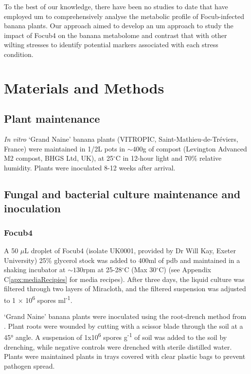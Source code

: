 To the best of our knowledge, there have been no studies to date that have employed \ac{um} to comprehensively analyse the metabolic profile of \ac{Focub}-infected banana plants. Our approach aimed to develop an \ac{um} approach to study the impact of \ac{Focub4} on the banana metabolome and contrast that with other wilting stresses to identify potential markers associated with each stress condition. 

\newpage
\section{Materials and Methods}
\label{sec:Chapter4_MM}

\subsection{Plant maintenance}
\textit{In vitro} ‘Grand Naine’ banana plants (VITROPIC, Saint-Mathieu-de-Tréviers, France) were maintained in 1/2L pots in $\sim400$g of compost (Levington Advanced M2 compost, BHGS Ltd, UK), at 25$^{\circ}$C in 12-hour light and 70\% relative humidity. Plants were inoculated 8-12 weeks after arrival. 

\subsection{Fungal and bacterial culture maintenance and inoculation}

\subsubsection{\acl{Focub4}}
A 50 \(\mu\)L droplet of \acl{Focub4} (isolate UK0001, provided by Dr Will Kay, Exeter University) 25\% glycerol stock was added to 400ml of \acf{pdb} and maintained in a shaking incubator at $\sim130$rpm at 25-28$^{\circ}$C (Max 30$^{\circ}$C) (see Appendix C\ref{apx:mediaRecipies} for media recipes). After three days, the liquid culture was filtered through two layers of Miracloth, and the filtered suspension was adjusted to 1 × 10\textsuperscript{6} spores ml\textsuperscript{-1}.

‘Grand Naine’ banana plants were inoculated using the root-drench method from \textcite{Garcia-Bastidas2019}. Plant roots were wounded by cutting with a scissor blade through the soil at a 45° angle. A suspension of 1x10\textsuperscript{6} spores g\textsuperscript{-1} of soil was added to the soil by drenching, while negative controls were drenched with sterile distilled water. Plants were maintained plants in trays covered with clear plastic bags to prevent pathogen spread. 

